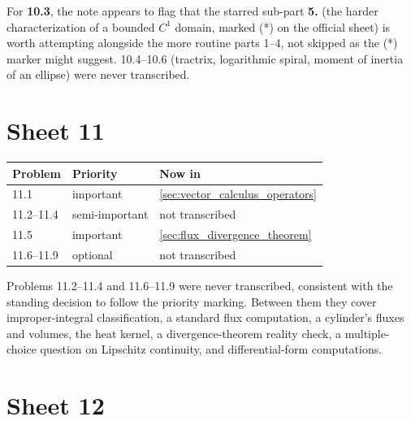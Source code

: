 \begin{ainote}
For \textbf{10.3}, the note  appears to flag that the starred sub-part
\textbf{5.} (the harder  characterization of a bounded $C^1$ domain, marked
(*) on the official sheet) is worth attempting alongside the more routine parts 1--4, not
skipped as the (*) marker might suggest. 10.4--10.6 (tractrix, logarithmic spiral, moment of
inertia of an ellipse) were never transcribed.
\end{ainote}

\section{Sheet 11}
\label{sec:sheet_index_11}

\begin{center}
\begin{tabular}{@{}l l l@{}}
\textbf{Problem} & \textbf{Priority} & \textbf{Now in} \\
\hline
11.1 & important & \cref{sec:vector_calculus_operators} \\[3pt]
11.2--11.4 & semi-important & not transcribed \\[3pt]
11.5 & important & \cref{sec:flux_divergence_theorem} \\[3pt]
11.6--11.9 & optional & not transcribed \\
\end{tabular}
\end{center}

\begin{ainote}
Problems 11.2--11.4 and 11.6--11.9 were never transcribed, consistent with the standing
decision to follow the priority marking. Between them they cover improper-integral
classification, a standard flux computation, a cylinder's fluxes and volumes, the heat kernel,
a divergence-theorem reality check, a multiple-choice question on Lipschitz continuity, and
differential-form computations.
\end{ainote}

\section{Sheet 12}
\label{sec:sheet_index_12}

